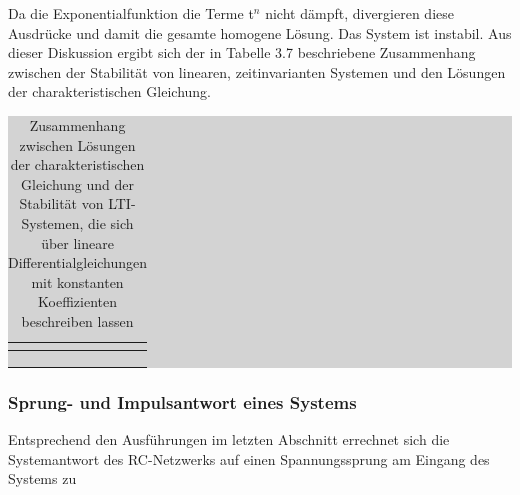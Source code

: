 \noindent Da die Exponentialfunktion die Terme t${}^{n}$ nicht d\"{a}mpft, divergieren diese Ausdr\"{u}cke und damit die gesamte homogene L\"{o}sung. Das System ist instabil. Aus dieser Diskussion ergibt sich der in Tabelle 3.7 beschriebene Zusammenhang zwischen der Stabilit\"{a}t von linearen, zeitinvarianten Systemen und den L\"{o}sungen der charakteristischen Gleichung.

\begin{table}[H]
\caption{Zusammenhang zwischen Lösungen der charakteristischen Gleichung und der Stabilität von LTI-Systemen, die sich über lineare Differentialgleichungen mit konstanten Koeffizienten beschreiben lassen }
\setlength{\fboxsep}{0pt}%
\colorbox{lightgray}{%
%
\begin{tabular}{| c | c |}
\hline
\parbox[c][0.28in][c]{3.2in}{\smallskip\centering\textbf{\selectfont{Eigenschaft}}} & \parbox[c][0.28in][c]{3.2in}{\smallskip\centering\textbf{\selectfont{Beschreibung}}}\\ \hline

\parbox[c][0.7in][c]{3.2in}{} &
\parbox[c][0.7in][c]{3.2in}{}\\ \hline

\parbox[c][0.8in][c]{3.2in}{} & 
\parbox[c][0.8in][c]{3.2in}{}\\ \hline

\parbox[c][0.8in][c]{3.2in}{} &
\parbox[c][0.8in][c]{3.2in}{}\\ \hline

\end{tabular}%
}\bigskip
\label{tab:threeseven}
\end{table}

\subsubsection{Sprung- und Impulsantwort eines Systems}
Entsprechend den Ausführungen im letzten Abschnitt errechnet sich die Systemantwort des RC-Netzwerks auf einen Spannungssprung am Eingang des Systems zu 

